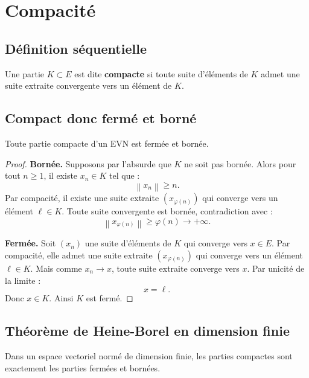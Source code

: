 \documentclass[11pt,a4paper]{article}
\newcommand{\norme}[1]{\left\lVert #1 \right\rVert}
\begin{document}
\section{Compacité}

\subsection{Définition séquentielle}

\begin{definitionbox}
Une partie \(K\subset E\) est dite \textbf{compacte} si toute suite d'éléments de \(K\) admet une suite extraite convergente vers un élément de \(K\).
\end{definitionbox}

\subsection{Compact donc fermé et borné}

\begin{theorembox}
Toute partie compacte d'un EVN est fermée et bornée.
\end{theorembox}

\begin{proof}
\textbf{Bornée.}  
Supposons par l'absurde que \(K\) ne soit pas bornée.  
Alors pour tout \(n\geq1\), il existe \(x_n\in K\) tel que :
\[
\norme{x_n}\geq n.
\]
Par compacité, il existe une suite extraite \((x_{\varphi(n)})\) qui converge vers un élément \(\ell\in K\).  
Toute suite convergente est bornée, contradiction avec :
\[
\norme{x_{\varphi(n)}}\geq \varphi(n)\to+\infty.
\]

\textbf{Fermée.}  
Soit \((x_n)\) une suite d'éléments de \(K\) qui converge vers \(x\in E\).  
Par compacité, elle admet une suite extraite \((x_{\varphi(n)})\) qui converge vers un élément \(\ell\in K\).  
Mais comme \(x_n\to x\), toute suite extraite converge vers \(x\).  
Par unicité de la limite :
\[
x=\ell.
\]
Donc \(x\in K\).  
Ainsi \(K\) est fermé.
\end{proof}

\subsection{Théorème de Heine-Borel en dimension finie}

\begin{theorembox}
Dans un espace vectoriel normé de dimension finie, les parties compactes sont exactement les parties fermées et bornées.
\end{theorembox}
\end{document}
